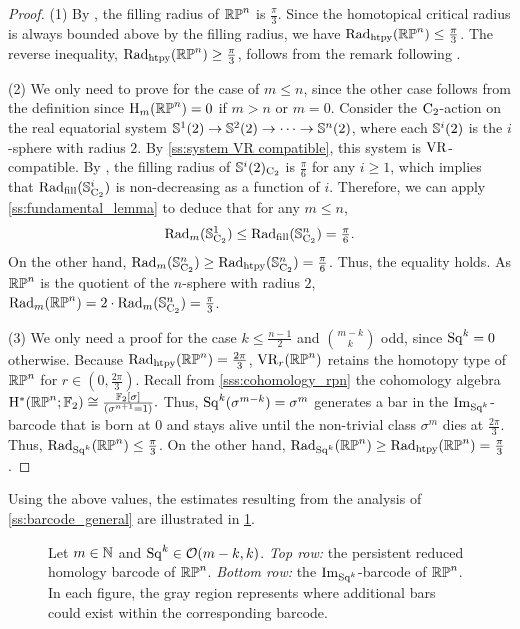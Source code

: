 \begin{proof}
	(1) By \cite{katz1983filling}, the filling radius of $\mathbb{RP}^n$ is $\frac{\pi}{3}$. 
    Since the homotopical critical radius is always bounded above by the filling radius, we have $\mathrm{Rad}_{\mathrm{htpy}}(\mathbb{RP}^n) \leq \frac{\pi}{3}$. 
    The reverse inequality, $\mathrm{Rad}_{\mathrm{htpy}}(\mathbb{RP}^n) \geq \frac{\pi}{3}$, follows from the remark following \cite[Thm.~4.5]{adams2022metric}.

	\smallskip (2) We only need to prove for the case of $m\leq n$, since the other case follows from the definition since \(\mathrm{H}_m(\mathbb{RP}^n) = 0\) if \(m > n\) or \(m = 0\).
    Consider the \(\mathrm{C}_2\)-action on the real equatorial system \(\mathbb{S}^{1}(2) \to \mathbb{S}^{2}(2) \to \dotsb \to \mathbb{S}^{n}(2)\), where each $\mathbb{S}^{i}(2)$ is the $i$-sphere with radius $2$.
    By \cref{ss:system VR compatible}, this system is \(\mathrm{VR}\)-compatible.
    By \cite{katz1983filling}, the filling radius of $\mathbb{S}^{i}(2)_{\mathrm{C}_2}$ is $\frac{\pi}{6}$ for any $i \geq 1$, which implies that $\mathrm{Rad}_{\mathrm{fill}}(\mathbb{S}^{i}_{\mathrm{C}_2})$ is non-decreasing as a function of \(i\).
    Therefore, we can apply \cref{ss:fundamental_lemma} to deduce that for any \(m \leq n\),
    \[
    \mathrm{Rad}_{m}(\mathbb{S}^{1}_{\mathrm{C}_2}) \leq \mathrm{Rad}_{\mathrm{fill}}(\mathbb{S}^{n}_{\mathrm{C}_2}) = \tfrac{\pi}{6}.
    \]
    On the other hand, $\mathrm{Rad}_{m}(\mathbb{S}^{n}_{\mathrm{C}_2})\geq \mathrm{Rad}_{\mathrm{htpy}}(\mathbb{S}^{n}_{\mathrm{C}_2}) = \tfrac{\pi}{6}$.
    Thus, the equality holds.
    As $\mathbb{RP}^n$ is the quotient of the $n$-sphere with radius $2$, $\mathrm{Rad}_{m}(\mathbb{RP}^n) = 2\cdot \mathrm{Rad}_{m}(\mathbb{S}^{n}_{\mathrm{C}_2}) = \frac{\pi}{3}$.

	\smallskip (3) We only need a proof for the case $k \leq \frac{n-1}{2}$ and $\binom{m-k}{k}$ odd, since \(\mathrm{Sq}^k = 0\) otherwise.
	Because $\mathrm{Rad}_{\mathrm{htpy}}(\mathbb{RP}^n)=\frac{2\pi}{3}$, $\mathrm{VR}_r(\mathbb{RP}^n)$ retains the homotopy type of $\mathbb{RP}^n$ for $r \in (0,\tfrac{2\pi}{3})$.
    Recall from \cref{sss:cohomology_rpn} the cohomology algebra \(\mathrm{H}^\ast(\mathbb{RP}^n; {\mathbb{F}_2}) \cong \frac{{\mathbb{F}_2}[\sigma]}{(\sigma^{n+1} = 1)}.\)
    Thus, $\mathrm{Sq}^k(\sigma^{m-k}) = \sigma^{m}$ generates a bar in the $\operatorname{Im}_{\mathrm{Sq}^k}$-barcode that is born at $0$ and stays alive until the non-trivial class $\sigma^{m}$ dies at $\tfrac{2\pi}{3}$.
	Thus, $\mathrm{Rad}_{\mathrm{Sq}^k}(\mathbb{RP}^n) \leq \tfrac{\pi}{3}$.
	On the other hand, $\mathrm{Rad}_{\mathrm{Sq}^k}(\mathbb{RP}^n) \geq \mathrm{Rad}_{\mathrm{htpy}}(\mathbb{RP}^n) = \tfrac{\pi}{3}$.
\end{proof}

Using the above values, the estimates resulting from the analysis of \cref{ss:barcode_general} are illustrated in \cref{fig:sq barcodes}.

\begin{figure}
	\centering
	
	\caption{Let $m \in \mathbb{N}$ and $\mathrm{Sq}^k \in \mathcal{O}(m-k, k)$.
        \emph{Top row:} the persistent reduced homology barcode of $\mathbb{RP}^n$.
		\emph{Bottom row:} the $\operatorname{Im}_{\mathrm{Sq}^k}$-barcode of $\mathbb{RP}^n$.
        In each figure, the gray region represents where additional bars could exist within the corresponding barcode.}
	\label{fig:sq barcodes}
\end{figure}

